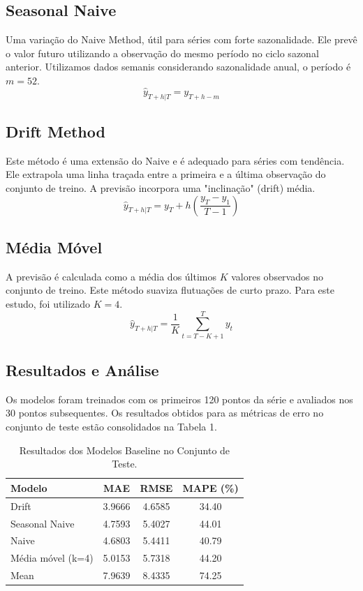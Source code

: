 \documentclass{article}
\begin{document}
\subsection*{Seasonal Naive}
Uma variação do Naive Method, útil para séries com forte sazonalidade. Ele prevê o valor futuro utilizando a observação do mesmo período no ciclo sazonal anterior. Utilizamos dados semanis considerando sazonalidade anual, o período é $m=52$.
$$ \hat{y}_{T+h|T} = y_{T+h-m} $$

\subsection*{Drift Method}
Este método é uma extensão do Naive e é adequado para séries com tendência. Ele extrapola uma linha traçada entre a primeira e a última observação do conjunto de treino. A previsão incorpora uma "inclinação" (drift) média.
$$ \hat{y}_{T+h|T} = y_T + h \left( \frac{y_T - y_1}{T-1} \right) $$

\subsection*{Média Móvel}
A previsão é calculada como a média dos últimos $K$ valores observados no conjunto de treino. Este método suaviza flutuações de curto prazo. Para este estudo, foi utilizado $K=4$.
$$ \hat{y}_{T+h|T} = \frac{1}{K}\sum_{t=T-K+1}^{T}y_t $$

\subsection*{Resultados e Análise}
Os modelos foram treinados com os primeiros 120 pontos da série e avaliados nos 30 pontos subsequentes. Os resultados obtidos para as métricas de erro no conjunto de teste estão consolidados na Tabela 1.

\begin{table}[h]
    \centering
    \begin{tabular}{|l|c|c|c|}
        \hline
        \textbf{Modelo} & \textbf{MAE} & \textbf{RMSE} & \textbf{MAPE (\%)} \\
        \hline
        Drift & 3.9666 & 4.6585 & 34.40 \\
        Seasonal Naive & 4.7593 & 5.4027 & 44.01 \\
        Naive & 4.6803 & 5.4411 & 40.79 \\
        Média móvel (k=4) & 5.0153 & 5.7318 & 44.20 \\
        Mean & 7.9639 & 8.4335 & 74.25 \\
        \hline
    \end{tabular}
    \caption{Resultados dos Modelos Baseline no Conjunto de Teste.}
    \label{tab:baseline_results}
\end{table}
\end{document}
